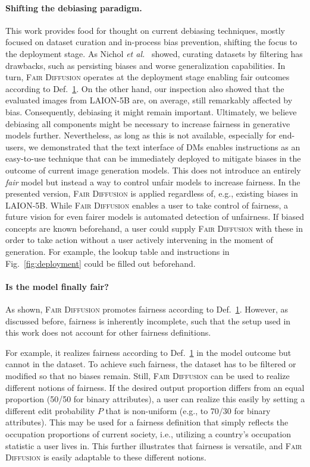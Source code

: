 \documentclass{article}%
\newcommand{\etal}{\emph{et al.}~}
\begin{document}
\paragraph{Shifting the debiasing paradigm.} This work provides food for thought on current debiasing techniques, mostly focused on dataset curation and in-process bias prevention, shifting the focus to the deployment stage. As Nichol \etal \cite{nichol2022glide} showed, curating datasets by filtering has drawbacks, such as persisting biases and worse generalization capabilities. In turn, \textsc{Fair Diffusion} operates at the deployment stage enabling fair outcomes according to Def.~\hyperref[def:fair1]{1}. On the other hand, our inspection also showed that the evaluated images from LAION-5B are, on average, still remarkably affected by bias. Consequently, debiasing it might remain important. Ultimately, we believe debiasing all components might be necessary to increase fairness in generative models further. Nevertheless, as long as this is not available, especially for end-users, we demonstrated that the text interface of DMs enables instructions as an easy-to-use technique that can be immediately deployed to mitigate biases in the outcome of current image generation models.
This does not introduce an entirely \textit{fair} model but instead a way to control unfair models to increase fairness. In the presented version, \textsc{Fair Diffusion} is applied regardless of, e.g., existing biases in LAION-5B.
While \textsc{Fair Diffusion} enables a user to take control of fairness, a future vision for even fairer models is automated detection of unfairness. If biased concepts are known beforehand, a user could supply \textsc{Fair Diffusion} with these in order to take action without a user actively intervening in the moment of generation. For example, the lookup table and instructions in Fig.~\ref{fig:deployment} could be filled out beforehand.

\paragraph{Is the model finally fair?} As shown, \textsc{Fair Diffusion} promotes fairness according to Def.~\hyperref[def:fair1]{1}. However, as discussed before, fairness is inherently incomplete, such that the setup used in this work does not account for other fairness definitions.

For example, it realizes fairness according to Def.~\hyperref[def:fair1]{1} in the model outcome but cannot in the dataset. To achieve such fairness, the dataset has to be filtered or modified so that no biases remain. 
Still, \textsc{Fair Diffusion} can be used to realize different notions of fairness. If the desired output proportion differs from an equal proportion (50/50 for binary attributes), a user can realize this easily by setting a different edit probability $P$ that is non-uniform (e.g., to 70/30 for binary attributes). This may be used for a fairness definition that simply reflects the occupation proportions of current society, i.e., utilizing a country's occupation statistic a user lives in. This further illustrates that fairness is versatile, and \textsc{Fair Diffusion} is easily adaptable to these different notions.
\end{document}
